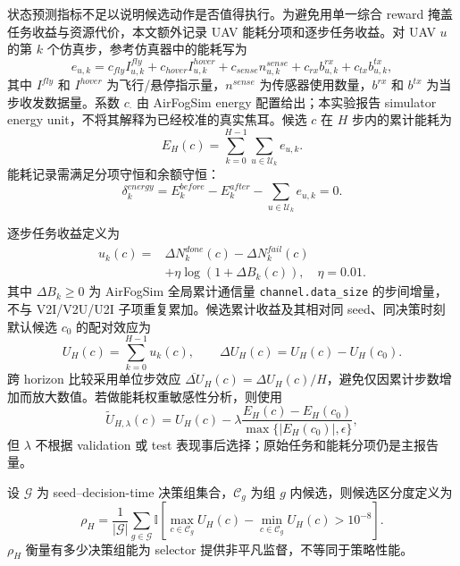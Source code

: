 \documentclass[letterpaper,journal]{IEEEtran}
\newcommand{\code}[1]{\texttt{#1}}
\begin{document}
状态预测指标不足以说明候选动作是否值得执行。为避免用单一综合 reward 掩盖任务收益与资源代价，本文额外记录 UAV 能耗分项和逐步任务收益。对 UAV $u$ 的第 $k$ 个仿真步，参考仿真器中的能耗写为
\begin{equation}
e_{u,k}=c_{fly}I^{fly}_{u,k}+c_{hover}I^{hover}_{u,k}
+c_{sense}n^{sense}_{u,k}+c_{rx}b^{rx}_{u,k}+c_{tx}b^{tx}_{u,k},
\label{eq:uav_step_energy}
\end{equation}
其中 $I^{fly}$ 和 $I^{hover}$ 为飞行/悬停指示量，$n^{sense}$ 为传感器使用数量，$b^{rx}$ 和 $b^{tx}$ 为当步收发数据量。系数 $c_{\cdot}$ 由 AirFogSim energy 配置给出；本实验报告 simulator energy unit，不将其解释为已经校准的真实焦耳。候选 $c$ 在 $H$ 步内的累计能耗为
\begin{equation}
E_H(c)=\sum_{k=0}^{H-1}\sum_{u\in\mathcal U_k}e_{u,k}.
\label{eq:candidate_energy}
\end{equation}
能耗记录需满足分项守恒和余额守恒：
\begin{equation}
\delta^{energy}_k=E^{before}_k-E^{after}_k-
\sum_{u\in\mathcal U_k}e_{u,k}=0.
\label{eq:energy_balance}
\end{equation}

逐步任务收益定义为
\begin{equation}
\begin{aligned}
u_k(c)={}&\Delta N^{done}_k(c)-\Delta N^{fail}_k(c)\\
&+\eta\log\!\left(1+\Delta B_k(c)\right),\quad \eta=0.01.
\end{aligned}
\label{eq:step_task_utility}
\end{equation}
其中 $\Delta B_k\geq 0$ 为 AirFogSim 全局累计通信量 \code{channel.data\_size} 的步间增量，不与 V2I/V2U/U2I 子项重复累加。候选累计收益及其相对同 seed、同决策时刻默认候选 $c_0$ 的配对效应为
\begin{equation}
U_H(c)=\sum_{k=0}^{H-1}u_k(c),\qquad
\Delta U_H(c)=U_H(c)-U_H(c_0).
\label{eq:paired_task_utility}
\end{equation}
跨 horizon 比较采用单位步效应 $\overline{\Delta U}_H(c)=\Delta U_H(c)/H$，避免仅因累计步数增加而放大数值。若做能耗权重敏感性分析，则使用
\begin{equation}
\widetilde U_{H,\lambda}(c)=U_H(c)-\lambda
\frac{E_H(c)-E_H(c_0)}{\max\{|E_H(c_0)|,\epsilon\}},
\label{eq:energy_aware_sensitivity}
\end{equation}
但 $\lambda$ 不根据 validation 或 test 表现事后选择；原始任务和能耗分项仍是主报告量。

设 $\mathcal G$ 为 seed--decision-time 决策组集合，$\mathcal C_g$ 为组 $g$ 内候选，则候选区分度定义为
\begin{equation}
\rho_H=\frac{1}{|\mathcal G|}\sum_{g\in\mathcal G}
\mathbb I\!\left[\max_{c\in\mathcal C_g}U_H(c)-\min_{c\in\mathcal C_g}U_H(c)>10^{-8}\right].
\label{eq:candidate_distinguishability}
\end{equation}
$\rho_H$ 衡量有多少决策组能为 selector 提供非平凡监督，不等同于策略性能。
\end{document}
